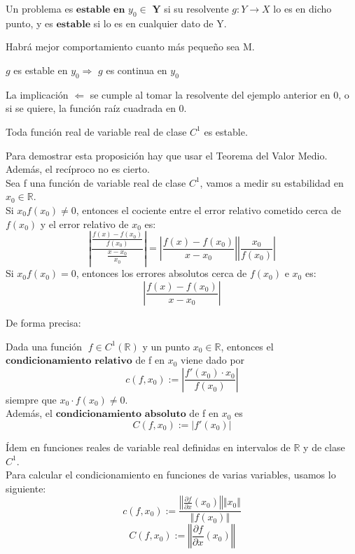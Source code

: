 \begin{ndef}
Un problema es $\textbf{estable en $y_0 \in$ Y}$ si su resolvente $g : Y \rightarrow X$ lo es en dicho punto, y es $\textbf{estable}$ si lo es en cualquier dato de Y.
\end{ndef}

Habrá mejor comportamiento cuanto más pequeño sea M.

\begin{nprop}
$g$ es estable en $y_0 \Rightarrow$ $g$ es continua en $y_0$ 
\end{nprop}

La implicación $\Leftarrow$ se cumple al tomar la resolvente del ejemplo anterior en 0, o si se quiere, la función raíz cuadrada en 0.\\

\begin{nprop}
Toda función real de variable real de clase $C^1$ es estable.
\end{nprop}

Para demostrar esta proposición hay que usar el Teorema del Valor Medio. Además, el recíproco no es cierto.\\
Sea f una función de variable real de clase $C^1$, vamos a medir su estabilidad en $x_0 \in \mathbb{R}$.\\
Si $x_0f(x_0) \neq 0$, entonces el cociente entre el error relativo cometido cerca de $f(x_0)$ y el error relativo de $x_0$ es:
\[ \left\vert \frac{\frac{f(x) - f(x_0)}{f(x_0)}}{\frac{x - x_0}{x_0}} \right\vert = \left\vert \frac{f(x) - f(x_0)}{x - x_0} \right\vert \left\vert \frac{x_0}{f(x_0)} \right\vert \]
Si $x_0f(x_0) = 0$, entonces los errores absolutos cerca de $f(x_0)$ e $x_0$ es:
\[ \left\vert \frac{f(x) - f(x_0)}{x - x_0} \right\vert \]

De forma precisa:

\begin{ndef}
Dada una función $\;f \in C^1(\mathbb{R})$ y un punto $x_0 \in \mathbb{R}$, entonces el $\textbf{condicionamiento relativo}$ de f en $x_0$ viene dado por
\[ c(f, x_0) := \left\vert \frac{f'(x_0)\cdot x_0}{f(x_0)} \right\vert \]
siempre que $x_0\cdot f(x_0) \neq 0$.\\
Además, el $\textbf{condicionamiento absoluto}$ de f en $x_0$ es
\[ C(f, x_0) := \vert f'(x_0) \vert \]
\end{ndef}

Ídem en funciones reales de variable real definidas en intervalos de $\mathbb{R}$ y de clase $C^1$.\\
Para calcular el condicionamiento en funciones de varias variables, usamos lo siguiente:
\[ c(f,x_0) := \frac{\left\Vert \frac{\partial f}{\partial x} (x_0) \right\Vert \Vert x_0 \Vert}{\Vert f(x_0) \Vert} \]
\[ C(f,x_0) := \left\Vert \frac{\partial f}{\partial x} (x_0) \right\Vert \]

